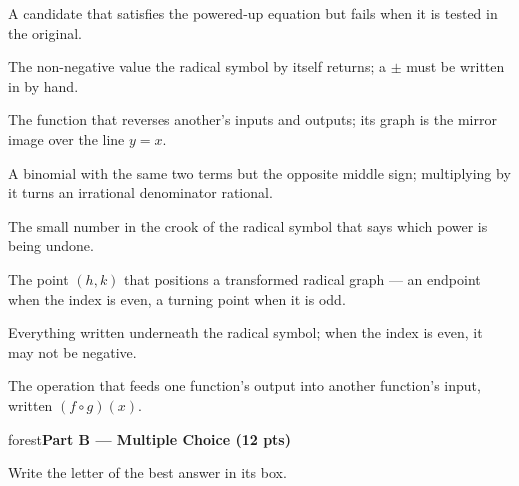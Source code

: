 \documentclass[10pt]{article}
\newcommand{\parthead}[1]{%
  \vspace{6pt}\noindent
  \begin{headlinebox}{forest}\color{white}\bfseries #1\end{headlinebox}%
  \vspace{4pt}}
\begin{document}
\begin{minipage}[t]{0.61\textwidth}
\small
\begin{description}[leftmargin=1.4em, itemsep=3pt]
  \item[(A)] A candidate that satisfies the powered-up equation but fails when it is tested in the original.
  \item[(B)] The non-negative value the radical symbol by itself returns; a $\pm$ must be written in by hand.
  \item[(C)] The function that reverses another's inputs and outputs; its graph is the mirror image over the line $y=x$.
  \item[(D)] A binomial with the same two terms but the opposite middle sign; multiplying by it turns an irrational denominator rational.
  \item[(E)] The small number in the crook of the radical symbol that says which power is being undone.
  \item[(F)] The point $(h,k)$ that positions a transformed radical graph --- an endpoint when the index is even, a turning point when it is odd.
  \item[(G)] Everything written underneath the radical symbol; when the index is even, it may not be negative.
  \item[(H)] The operation that feeds one function's output into another function's input, written $(f\circ g)(x)$.
\end{description}
\end{minipage}

\parthead{Part B --- Multiple Choice (12 pts)}
Write the letter of the best answer in its box.
\end{document}
